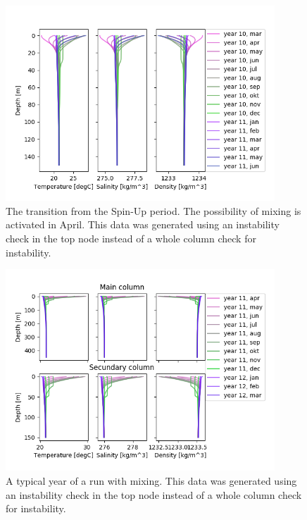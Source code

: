 \documentclass[twocolumn]{article}
\begin{document}
\begin{figure}
\centering
\includegraphics[width=0.9\textwidth,keepaspectratio]{Transition.png}
\caption{The transition from the Spin-Up period. The possibility of mixing is activated in April. This data was generated using an instability check in the top node instead of a whole column check for instability.}
\label{fig:Transition}
\end{figure}



\begin{figure}
\centering
\includegraphics[width=0.9\textwidth,keepaspectratio]{Conv_only.png}
\caption{A typical year of a run with mixing. This data was generated using an instability check in the top node instead of a whole column check for instability.}
\label{fig:Conv_Only}
\end{figure}
\end{document}
